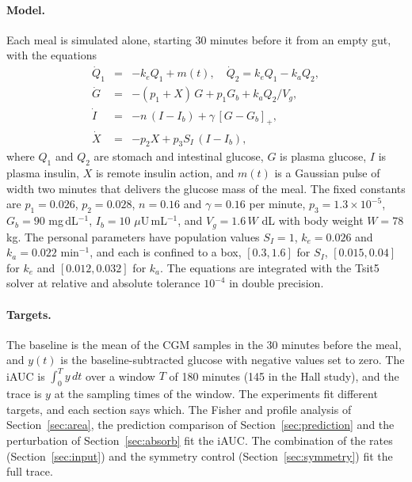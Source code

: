 \documentclass[letterpaper]{article} %
\newcommand{\resCohortCgmWindow}{180}
\newcommand{\resCohortHallWindow}{145}
\begin{document}
\paragraph{Model.} Each meal is simulated alone, starting 30 minutes before it from an empty gut, with the equations
\begin{eqnarray}
\dot Q_1 &=& -k_e Q_1 + m(t),\quad \dot Q_2 = k_e Q_1 - k_a Q_2,\nonumber\\
\dot G &=& -(p_1 + X)\,G + p_1 G_b + k_a Q_2 / V_g,\nonumber\\
\dot I &=& -n\,(I - I_b) + \gamma\,[G - G_b]_+,\nonumber\\
\dot X &=& -p_2 X + p_3 S_I\,(I - I_b),\nonumber
\end{eqnarray}
where $Q_1$ and $Q_2$ are stomach and intestinal glucose, $G$ is plasma glucose, $I$ is plasma insulin, $X$ is remote insulin action, and $m(t)$ is a Gaussian pulse of width two minutes that delivers the glucose mass of the meal. The fixed constants are $p_1=0.026$, $p_2=0.028$, $n=0.16$ and $\gamma=0.16$ per minute, $p_3=1.3\times10^{-5}$, $G_b=90$ mg\,dL$^{-1}$, $I_b=10$ $\mu$U\,mL$^{-1}$, and $V_g=1.6\,W$ dL with body weight $W=78$ kg. The personal parameters have population values $S_I=1$, $k_e=0.026$ and $k_a=0.022$ min$^{-1}$, and each is confined to a box, $[0.3,1.6]$ for $S_I$, $[0.015,0.04]$ for $k_e$ and $[0.012,0.032]$ for $k_a$. The equations are integrated with the Tsit5 solver at relative and absolute tolerance $10^{-4}$ in double precision.

\paragraph{Targets.} The baseline is the mean of the CGM samples in the 30 minutes before the meal, and $y(t)$ is the baseline-subtracted glucose with negative values set to zero. The iAUC is $\int_0^T y\,dt$ over a window $T$ of \resCohortCgmWindow{} minutes (\resCohortHallWindow{} in the Hall study), and the trace is $y$ at the sampling times of the window. The experiments fit different targets, and each section says which. The Fisher and profile analysis of Section~\ref{sec:area}, the prediction comparison of Section~\ref{sec:prediction} and the perturbation of Section~\ref{sec:absorb} fit the iAUC. The combination of the rates (Section~\ref{sec:input}) and the symmetry control (Section~\ref{sec:symmetry}) fit the full trace.
\end{document}
